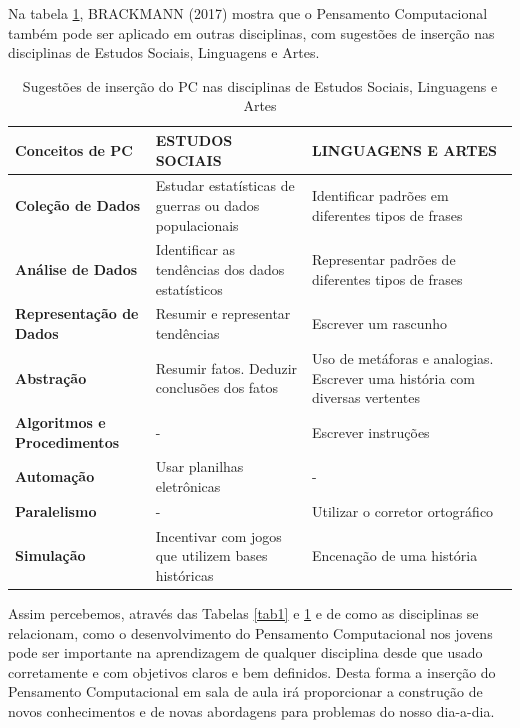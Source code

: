 \documentclass[12pt, openright, a4paper, brazil, english, french, spanish, bibjustif, openany, oneside]{abntex2}
\begin{document}
\newpage

Na tabela \ref{tab2}, BRACKMANN (2017) mostra que o Pensamento Computacional também pode ser aplicado em outras disciplinas, com sugestões de inserção nas disciplinas de Estudos Sociais, Linguagens e Artes. 

\begin{table}[h]
        \centering
        \caption{Sugestões de inserção do PC nas disciplinas de Estudos Sociais, Linguagens e Artes \label{tab2}}
                
        \begin{tabular}{ >{\centering\arraybackslash}m{3cm} >{\centering\arraybackslash}m{5.5cm} >{\centering\arraybackslash}m{6cm}}
            \toprule
            \textbf{Conceitos de PC} & \textbf{ESTUDOS SOCIAIS} & \textbf{LINGUAGENS E ARTES} \\
            \midrule
            \textbf{Coleção de Dados} & Estudar estatísticas de guerras ou dados populacionais  & Identificar padrões em diferentes tipos de frases \\
            \midrule
            \textbf{Análise de Dados} & Identificar as tendências dos dados estatísticos & Representar padrões de diferentes tipos de frases  \\
            \midrule
            \textbf{Representação de Dados} & Resumir e representar tendências & Escrever um rascunho \\
            \midrule
            \textbf{Abstração} & Resumir fatos. Deduzir conclusões dos fatos & Uso de metáforas e analogias. Escrever uma história com diversas vertentes \\
            \midrule
            \textbf{Algoritmos e Procedimentos} & - & Escrever instruções \\
            \midrule
            \textbf{Automação} & Usar planilhas eletrônicas & - \\
            \midrule
            \textbf{Paralelismo} & - & Utilizar o corretor ortográfico \\
            \midrule
            \textbf{Simulação} & Incentivar com jogos que utilizem bases históricas & Encenação de uma história \\
            \bottomrule
        \end{tabular}
    \end{table}

Assim percebemos, através das Tabelas \ref{tab1} e \ref{tab2} e de como as disciplinas se relacionam, como o desenvolvimento do Pensamento Computacional nos jovens pode ser importante na aprendizagem de qualquer disciplina desde que usado corretamente e com objetivos claros e bem definidos. Desta forma a inserção do Pensamento Computacional em sala de aula irá proporcionar a construção de novos conhecimentos e de novas abordagens para problemas do nosso dia-a-dia.
\end{document}
